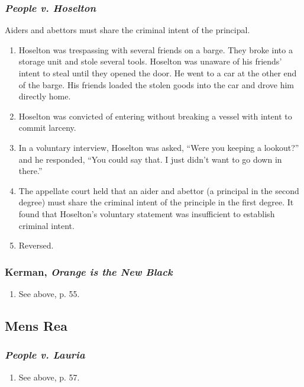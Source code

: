 \subsubsection{\emph{People v. Hoselton}}

Aiders and abettors must share the criminal intent of the principal.

\begin{enumerate}
    \item Hoselton was trespassing with several friends on a barge. They broke 
    into a storage unit and stole several tools. Hoselton was unaware of his 
    friends' intent to steal until they opened the door. He went to a car at 
    the other end of the barge. His friends loaded the stolen goods into the 
    car and drove him directly home.
    \item Hoselton was convicted of entering without breaking a vessel with 
    intent to commit larceny.
    \item In a voluntary interview, Hoselton was asked, ``Were you keeping a 
    lookout?'' and he responded, ``You could say that. I just didn't want to 
    go down in there.''
    \item The appellate court held that an aider and abettor (a principal in 
    the second degree) must share the criminal intent of the principle in the 
    first degree. It found that Hoselton's voluntary statement was 
    insufficient to establish criminal intent.
    \item Reversed.
\end{enumerate}

\subsubsection{Kerman, \emph{Orange is the New Black}}

\begin{enumerate}
    \item See above, p. 55.
\end{enumerate}

\subsection{Mens Rea}

\subsubsection{\emph{People v. Lauria}}

\begin{enumerate}
    \item See above, p. 57.
\end{enumerate}

